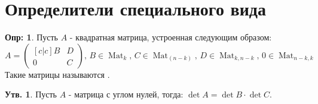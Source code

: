 \documentclass[12pt]{article}
\theoremstyle{definition}
\newtheorem{defn}{Опр:}
\newtheorem{prop}{Утв.}
\newcommand{\matsq}[1]{\operatorname{Mat}_{#1}}
\newcommand{\mat}[2]{\operatorname{Mat}_{#1, #2}}
\begin{document}
\newpage
\section*{Определители специального вида}
\begin{defn}
	Пусть $A$ - квадратная матрица, устроенная следующим образом:
	$$
		A = 
		\begin{pmatrix}[c|c]
			B & D\\ \hline
			0 & C
		\end{pmatrix}, \, B \in \matsq{k}, \, C \in \matsq{(n-k)}, \, D \in \mat{k}{n-k}, \, 0 \in \mat{n-k}{k}
	$$
	Такие матрицы называются .
\end{defn}
\begin{prop}
	Пусть $A$ - матрица с углом нулей, тогда: $\det{A} = \det{B}{\cdot}\det{C}$.
\end{prop}
\end{document}
